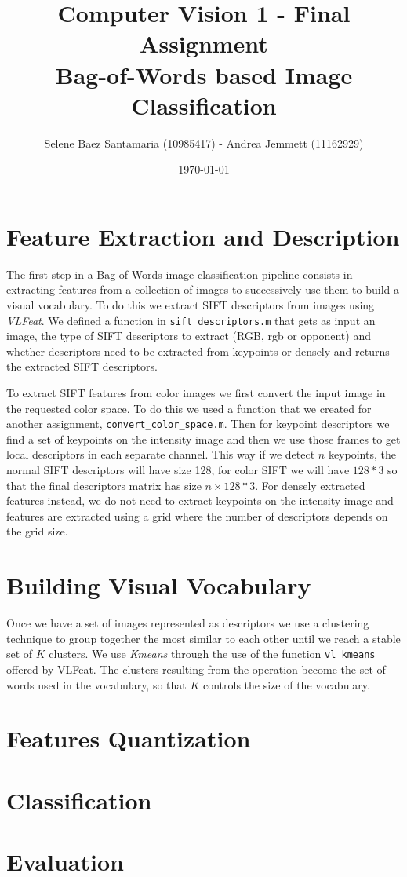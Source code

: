 \documentclass[11pt]{article}
\title{
	{Computer Vision 1 - Final Assignment\\
	 Bag-of-Words based Image Classification}
}
\author{
Selene Baez Santamaria (10985417) - Andrea Jemmett (11162929)}
\date{\today}
\begin{document}
\maketitle


\section{Feature Extraction and Description}
The first step in a Bag-of-Words image classification pipeline consists in
extracting features from a collection of images to successively use them to
build a visual vocabulary. To do this we extract SIFT descriptors from images
using \textit{VLFeat}. We defined a function in \texttt{sift\_descriptors.m}
that gets as input an image, the type of SIFT descriptors to extract (RGB, rgb
or opponent) and whether descriptors need to be extracted from keypoints or
densely and returns the extracted SIFT descriptors.

To extract SIFT features from color images we first convert the input image in
the requested color space. To do this we used a function that we created for
another assignment, \texttt{convert\_color\_space.m}. Then for keypoint
descriptors we find a set of keypoints on the intensity image and then we use
those frames to get local descriptors in each separate channel. This way if we
detect $n$ keypoints, the normal SIFT descriptors will have size 128, for color
SIFT we will have $128*3$ so that the final descriptors matrix has size $n
\times 128*3$.  For densely extracted features instead, we do not need to
extract keypoints on the intensity image and features are extracted using a grid
where the number of descriptors depends on the grid size.


\section{Building Visual Vocabulary}
Once we have a set of images represented as descriptors we use a clustering
technique to group together the most similar to each other until we reach a
stable set of $K$ clusters. We use \textit{Kmeans} through the use of the
function \texttt{vl\_kmeans} offered by VLFeat. The clusters resulting from the
operation become the set of words used in the vocabulary, so that $K$ controls
the size of the vocabulary.


\section{Features Quantization}



\section{Classification}



\section{Evaluation}
\end{document}
